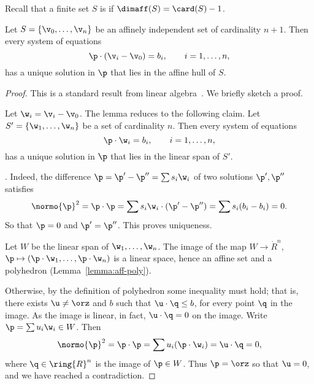 Recall that a finite set $S$
is  if $\dimaff(S) = \card(S) -1$.

\begin{lemma}\label{lemma:affine-system}
Let $S=\{\v_0,\ldots,\v_n\}$ be an affinely independent set of cardinality $n+1$.
Then every system of equations
\begin{displaymath}
\p \cdot (\v_i - \v_0) = b_i,\qquad i=1,\ldots,n,
\end{displaymath}
has a unique solution in $\p$ that lies in the affine hull of $S$.
\end{lemma}

\begin{proof} This is a standard result from linear algebra~\cite{XX}.
We briefly sketch a proof.

Let $\w_i = \v_i-\v_0$.  The lemma reduces to the following claim.
Let $S' = \{\w_1,\ldots,\w_n\}$ be a  set
of cardinality $n$.  Then every system of equations
\begin{displaymath}
\p \cdot \w_i = b_i,\qquad i=1,\ldots,n,
\end{displaymath}
has a unique solution in $\p$ that lies in the linear span of $S'$.

. Indeed, the difference 
$\p = \p'-\p'' = \sum s_i \w_i$ of two solutions
$\p',\p''$ satisfies
\begin{displaymath}
\normo{\p}^2=\p\cdot\p = \sum s_i \w_i \cdot (\p' - \p'') =
\sum s_i (b_i-b_i)= 0.
\end{displaymath}
So that $\p=0$ and $\p'=\p''$.  This proves uniqueness.

Let $W$ be the linear span of $\w_1,\ldots,\w_n$.  The image of the map $W\to\ring{R}^n$, $\p\mapsto (\p\cdot\w_1,\ldots,\p\cdot\w_n)$ is a linear space, hence an affine set and a polyhedron (Lemma~\ref{lemma:aff-poly}).  

Otherwise, by the definition of polyhedron some inequality must hold; that is, there exists $\u\ne \orz$ and $b$ such that $\u\cdot \q \le b$, for every point $\q$ in the image.  As the image is linear, in fact, $\u\cdot \q = 0$ on the image.  Write $\p = \sum u_i \w_i\in W$.  Then
\begin{displaymath}
\normo{\p}^2 = \p\cdot\p = \sum u_i (\p \cdot \w_i) = \u\cdot \q = 0,
\end{displaymath} 
where $\q\in\ring{R}^n$ is the image of $\p\in W$.
Thus $\p=\orz$ so that $\u=0$, and we have reached a contradiction.

\end{proof}


